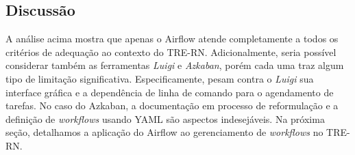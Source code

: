 






\subsection{Discussão}

A análise acima mostra que apenas o Airflow atende completamente a todos os critérios de adequação ao contexto do TRE-RN. Adicionalmente, seria possível considerar também as ferramentas \textit{Luigi} e \textit{Azkaban}, porém cada uma traz algum tipo de limitação significativa. Especificamente, pesam contra o \textit{Luigi} sua interface gráfica e a dependência de linha de comando para o agendamento de tarefas. No caso do Azkaban, a documentação em processo de reformulação e a definição de \textit{workflows} usando YAML são aspectos indesejáveis. Na próxima seção, detalhamos a aplicação do Airflow ao gerenciamento de \textit{workflows} no TRE-RN.

